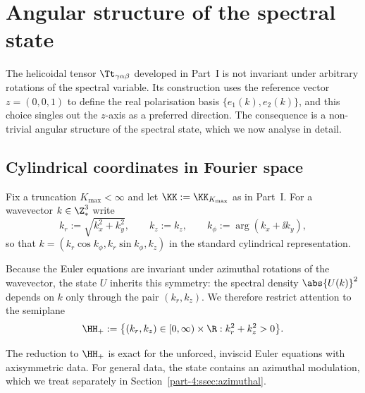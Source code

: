 \section{Angular structure of the spectral state}
\label{part-4:sec:angular}

The helicoidal tensor $\Tt_{\gamma\alpha\beta}$ developed in Part~I is 
not invariant under arbitrary rotations of the spectral variable. Its 
construction uses the reference vector $z = (0,0,1)$ to define the 
real polarisation basis $\{e_1(k), e_2(k)\}$, and this choice singles 
out the $z$-axis as a preferred direction. The consequence is a 
non-trivial angular structure of the spectral state, which we now 
analyse in detail.

\subsection{Cylindrical coordinates in Fourier space}
\label{part-4:ssec:cyl}

Fix a truncation $K_{\max}<\infty$ and let $\KK := \KK_{K_{\max}}$ as 
in Part~I. For a wavevector $k\in\Z^3_\ast$ write
\begin{equation}\label{part-4:eq:cyl-coords}
k_r := \sqrt{k_x^2+k_y^2}, \qquad k_z := k_z, \qquad
k_\phi := \arg(k_x+\ii k_y),
\end{equation}
so that $k = (k_r\cos k_\phi, k_r\sin k_\phi, k_z)$ in the standard 
cylindrical representation.

\begin{definition}\label{part-4:def:semiplane}
Because the Euler equations are invariant under azimuthal rotations 
of the wavevector, the state $U$ inherits this symmetry: the spectral 
density $\abs{U(k)}^2$ depends on $k$ only through the pair 
$(k_r, k_z)$. We therefore restrict attention to the semiplane
\begin{equation}\label{part-4:eq:semiplane}
\HH_+ := \bigl\{(k_r, k_z)\in[0,\infty)\times\R : k_r^2+k_z^2>0\bigr\}.
\end{equation}
\end{definition}

\begin{remark}\label{part-4:rem:azimuthal}
The reduction to $\HH_+$ is exact for the unforced, inviscid Euler 
equations with axisymmetric data. For general data, the state 
contains an azimuthal modulation, which we treat separately in 
Section~\ref{part-4:ssec:azimuthal}.
\end{remark}

